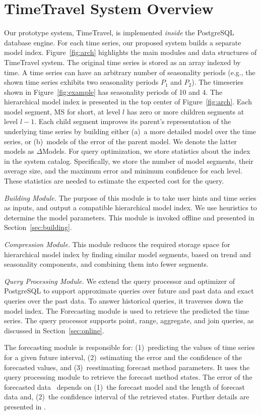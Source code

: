 \documentclass[10pt,conference,letterpaper]{IEEEtran}
\newcommand{\LN}{hierarchical model index}
\newcommand{\LNs}{hierarchical model index }
\begin{document}
\section{TimeTravel System Overview}
\label{sec:overview}
Our prototype  system, TimeTravel, is implemented {\em inside} the PostgreSQL database engine. For each time series, our proposed system builds a separate model index. Figure~\ref{fig:arch} highlights the main modules and data structures of TimeTravel system. The original time series is stored as an array indexed by time. A time series can have an arbitrary number of seasonality periods (e.g., the shown time series exhibits two seasonality periods $P_1$ and $P_2$). The timeseries shown in Figure~\ref{fig:example} has seasonality periods of 10 and 4. The \LNs is presented in the top center of Figure~\ref{fig:arch}. Each model segment, MS for short, at level $l$ has zero or more children segments at level $l-1$.  Each child segment improves its parent's representation of the underlying time series by building either (a)~a more detailed model over the time series, 
or (b)~models of the error of the parent model. We denote the latter models as $\Delta$Models. 
For query optimization, we store statistics about the index in the system catalog. Specifically, we store the number of model segments, their average size, and the maximum error and minimum confidence for each level. These statistics are needed to estimate the expected cost for the query.


{\em Building Module.}  The purpose of this  module is to take user hints and time series as inputs, and output a compatible \LN. 
We use heuristics to determine the model parameters. This module is invoked offline and presented in Section~\ref{sec:building}.

{\em Compression Module.} This module reduces the required storage space for \LNs by finding similar model segments, based on trend and seasonality components, and combining them into fewer segments. 


{\em Query Processing Module.} We extend the query processor and optimizer of PostgreSQL to support approximate queries over future and past data and exact queries over the past data. 
To answer historical queries, it traverses down the model index. The Forecasting module is used to retrieve the predicted the time series.
The query processor supports point, range, aggregate, and join queries, as discussed in Section~\ref{sec:online}. 

 The forecasting module is responsible for: (1)~predicting the values of time series for a given future interval, (2)~estimating the error and the confidence of the 
forecasted values, and (3)~reestimating forecast method parameters. It uses the query processing module to retrieve the forecast method states. The error of the forecasted data~\cite{tBOX76a} depends on (1)~the forecast model and the length of forecast data and, (2)~the confidence interval of the retrieved states. Further details are presented in \cite{FRL12}.
\end{document}
